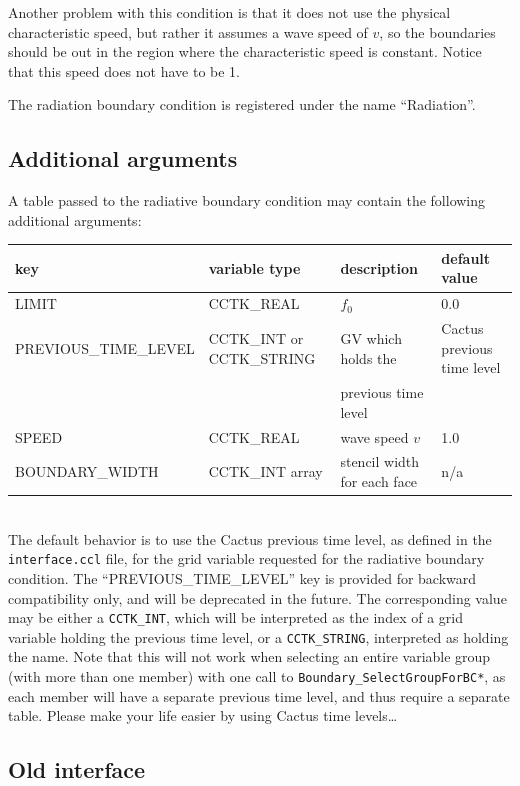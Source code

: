\documentclass{article}
\begin{document}
Another problem with this condition is that it does not
use the physical characteristic speed, but rather it assumes
a wave speed of $v$, so the boundaries should be out in
the region where the characteristic speed is constant.
Notice that this speed does not have to be 1.

The radiation boundary condition is registered under the name ``Radiation''.


\subsection{Additional arguments}

A table passed to the radiative boundary condition may contain the
following additional arguments:\\[1mm]
\begin{tabular}{|l|l|l|l|}
\hline
\textbf{key} & \textbf{variable type} & \textbf{description} & \textbf{default value}\\
\hline
LIMIT & CCTK\_REAL & $f_0$ & 0.0\\
PREVIOUS\_TIME\_LEVEL & CCTK\_INT or CCTK\_STRING & GV which holds the & Cactus previous time level\\
&& previous time level&\\
SPEED & CCTK\_REAL & wave speed $v$& 1.0\\
BOUNDARY\_WIDTH & CCTK\_INT array & stencil width for each face & n/a\\
\hline
\end{tabular}
\\[1mm] The default behavior is to use the Cactus previous time level,
as defined in the \texttt{interface.ccl} file, for the grid variable
requested for the radiative boundary condition.  The
``PREVIOUS\_TIME\_LEVEL''
key is provided for backward compatibility only, and will be
deprecated in the future.  The corresponding value may be either a
\texttt{CCTK\_INT}, which will be interpreted as the index of a grid
variable holding the previous time level, or a \texttt{CCTK\_STRING},
interpreted as holding the name.  Note that this will not work when
selecting an entire variable group (with more than one member) with
one call to \texttt{Boundary\_SelectGroupForBC*}, as each member will
have a separate previous time level, and thus require a separate
table.  Please make your life easier by using Cactus time levels\ldots


\subsection{Old interface}
\end{document}
